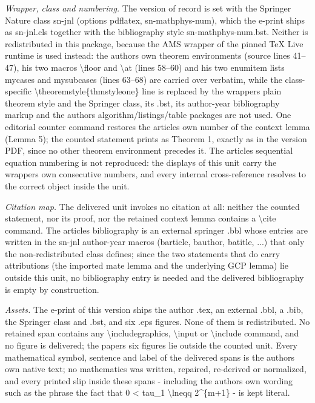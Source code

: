 \documentclass[10pt,a4paper]{amsart}
\theoremstyle{plain}
\begin{document}
\noindent\textit{Wrapper, class and numbering.} The version of record is set with the Springer Nature class sn-jnl (options pdflatex, sn-mathphys-num), which the e-print ships as sn-jnl.cls together with the bibliography style sn-mathphys-num.bst. Neither is redistributed in this package, because the AMS wrapper of the pinned TeX Live runtime is used instead: the author\textquotesingle s own theorem environments (source lines 41--47), his two macros \textbackslash{}floor and \textbackslash{}at (lines 58--60) and his two enumitem lists mycases and mysubcases (lines 63--68) are carried over verbatim, while the class-specific \textbackslash{}theoremstyle\{thmstyleone\} line is replaced by the wrapper\textquotesingle s plain theorem style and the Springer class, its .bst, its author-year bibliography markup and the author\textquotesingle s algorithm/listings/table packages are not used. One editorial counter command restores the article\textquotesingle s own number of the context lemma (Lemma 5); the counted statement prints as Theorem 1, exactly as in the version PDF, since no other theorem environment precedes it. The article\textquotesingle s sequential equation numbering is not reproduced: the displays of this unit carry the wrapper\textquotesingle s own consecutive numbers, and every internal cross-reference resolves to the correct object inside the unit.\par
\noindent\textit{Citation map.} The delivered unit invokes no citation at all: neither the counted statement, nor its proof, nor the retained context lemma contains a \textbackslash{}cite command. The article\textquotesingle s bibliography is an external springer .bbl whose entries are written in the sn-jnl author-year macros (barticle, bauthor, batitle, ...) that only the non-redistributed class defines; since the two statements that do carry attributions (the imported mate lemma and the underlying GCP lemma) lie outside this unit, no bibliography entry is needed and the delivered bibliography is empty by construction.\par
\noindent\textit{Assets.} The e-print of this version ships the author .tex, an external .bbl, a .bib, the Springer class and .bst, and six .eps figures. None of them is redistributed. No retained span contains any \textbackslash{}includegraphics, \textbackslash{}input or \textbackslash{}include command, and no figure is delivered; the paper\textquotesingle s six figures lie outside the counted unit. Every mathematical symbol, sentence and label of the delivered spans is the author\textquotesingle s own native text; no mathematics was written, repaired, re-derived or normalized, and every printed slip inside these spans - including the author\textquotesingle s own wording such as the phrase the fact that 0 < tau\_1 \textbackslash{}lneqq 2\^{}\{m+1\} - is kept literal.\par
\end{document}
